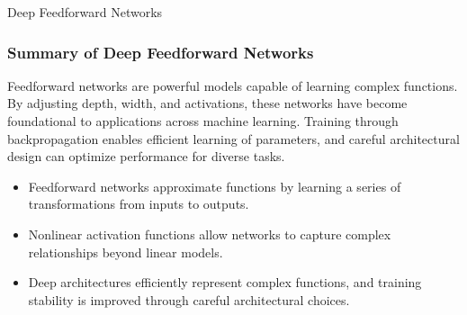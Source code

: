 \begin{notes}{Deep Feedforward Networks}
    \subsubsection*{Summary of Deep Feedforward Networks}
    
    Feedforward networks are powerful models capable of learning complex functions. By adjusting depth, width, and activations, these networks have become foundational to applications across machine 
    learning. Training through backpropagation enables efficient learning of parameters, and careful architectural design can optimize performance for diverse tasks.
    
    \begin{highlight}
        \begin{itemize}
            \item Feedforward networks approximate functions by learning a series of transformations from inputs to outputs.
            \item Nonlinear activation functions allow networks to capture complex relationships beyond linear models.
            \item Deep architectures efficiently represent complex functions, and training stability is improved through careful architectural choices.
        \end{itemize}
    \end{highlight}
\end{notes}
